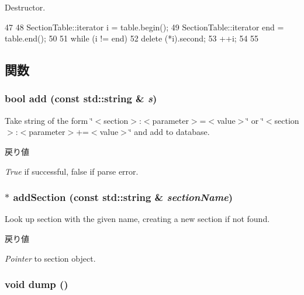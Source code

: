 Destructor. 


\begin{DoxyCode}
47 {
48     SectionTable::iterator i = table.begin();
49     SectionTable::iterator end = table.end();
50 
51     while (i != end) {
52         delete (*i).second;
53         ++i;
54     }
55 }
\end{DoxyCode}


\subsection{関数}
\hypertarget{classIniFile_af29519b90a46a24b4b0910b17a89c455}{
\subsubsection[{add}]{\setlength{\rightskip}{0pt plus 5cm}bool add (const std::string \& {\em s})}}
\label{classIniFile_af29519b90a46a24b4b0910b17a89c455}
Take string of the form \char`\"{}$<$section$>$:$<$parameter$>$=$<$value$>$\char`\"{} or \char`\"{}$<$section$>$:$<$parameter$>$+=$<$value$>$\char`\"{} and add to database. 
\begin{DoxyRetVals}{戻り値}
\item[{\em True}]if successful, false if parse error. \end{DoxyRetVals}
\hypertarget{classIniFile_a482706394c2a427dca9f470a011435f0}{
\subsubsection[{addSection}]{$\ast$ addSection (const std::string \& {\em sectionName})}}
\label{classIniFile_a482706394c2a427dca9f470a011435f0}
Look up section with the given name, creating a new section if not found. 
\begin{DoxyRetVals}{戻り値}
\item[{\em Pointer}]to section object. \end{DoxyRetVals}
\hypertarget{classIniFile_accd2600060dbaee3a3b41aed4034c63c}{
\subsubsection[{dump}]{\setlength{\rightskip}{0pt plus 5cm}void dump ()}}
\label{classIniFile_accd2600060dbaee3a3b41aed4034c63c}


